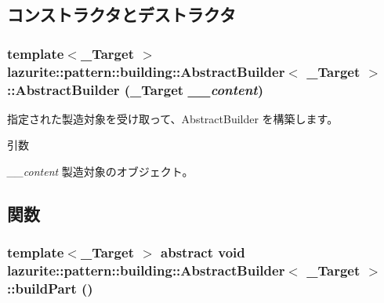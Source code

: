 \subsection{コンストラクタとデストラクタ}
\hypertarget{classlazurite_1_1pattern_1_1building_1_1_abstract_builder_3_01___target_01_4_a9dc60f080d297e7852f209f1e122c306}{
\subsubsection[{AbstractBuilder}]{\setlength{\rightskip}{0pt plus 5cm}template$<$\_\-Target $>$ lazurite::pattern::building::AbstractBuilder$<$ \_\-Target $>$::AbstractBuilder (\_\-Target {\em \_\-\_\-content})}}
\label{classlazurite_1_1pattern_1_1building_1_1_abstract_builder_3_01___target_01_4_a9dc60f080d297e7852f209f1e122c306}


指定された製造対象を受け取って、AbstractBuilder を構築します。 
\begin{DoxyParams}{引数}
\item[{\em \_\-\_\-content}]製造対象のオブジェクト。\end{DoxyParams}


\subsection{関数}
\hypertarget{classlazurite_1_1pattern_1_1building_1_1_abstract_builder_3_01___target_01_4_a4ddf3d66757e93e0a410708fff784801}{
\subsubsection[{buildPart}]{\setlength{\rightskip}{0pt plus 5cm}template$<$\_\-Target $>$ abstract void lazurite::pattern::building::AbstractBuilder$<$ \_\-Target $>$::buildPart ()}}
\label{classlazurite_1_1pattern_1_1building_1_1_abstract_builder_3_01___target_01_4_a4ddf3d66757e93e0a410708fff784801}


